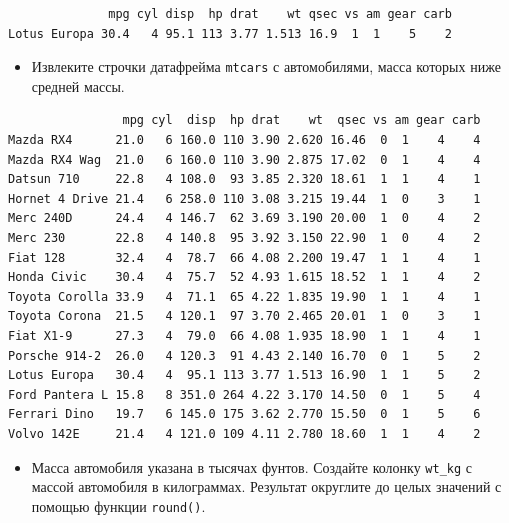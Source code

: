 \documentclass[
]{book}
\newenvironment{Shaded}{\begin{snugshade}}{\end{snugshade}}
\newcommand{\KeywordTok}[1]{\textcolor[rgb]{0.13,0.29,0.53}{\textbf{#1}}}
\newcommand{\NormalTok}[1]{#1}
\newcommand{\OperatorTok}[1]{\textcolor[rgb]{0.81,0.36,0.00}{\textbf{#1}}}
\newcommand{\StringTok}[1]{\textcolor[rgb]{0.31,0.60,0.02}{#1}}
\providecommand{\tightlist}{%
  \setlength{\itemsep}{0pt}\setlength{\parskip}{0pt}}
\begin{document}
\begin{verbatim}
              mpg cyl disp  hp drat    wt qsec vs am gear carb
Lotus Europa 30.4   4 95.1 113 3.77 1.513 16.9  1  1    5    2
\end{verbatim}

\begin{itemize}
\tightlist
\item
  Извлеките строчки датафрейма \texttt{mtcars} с автомобилями, масса которых ниже средней массы.
\end{itemize}

\begin{Shaded}
\end{Shaded}

\begin{verbatim}
                mpg cyl  disp  hp drat    wt  qsec vs am gear carb
Mazda RX4      21.0   6 160.0 110 3.90 2.620 16.46  0  1    4    4
Mazda RX4 Wag  21.0   6 160.0 110 3.90 2.875 17.02  0  1    4    4
Datsun 710     22.8   4 108.0  93 3.85 2.320 18.61  1  1    4    1
Hornet 4 Drive 21.4   6 258.0 110 3.08 3.215 19.44  1  0    3    1
Merc 240D      24.4   4 146.7  62 3.69 3.190 20.00  1  0    4    2
Merc 230       22.8   4 140.8  95 3.92 3.150 22.90  1  0    4    2
Fiat 128       32.4   4  78.7  66 4.08 2.200 19.47  1  1    4    1
Honda Civic    30.4   4  75.7  52 4.93 1.615 18.52  1  1    4    2
Toyota Corolla 33.9   4  71.1  65 4.22 1.835 19.90  1  1    4    1
Toyota Corona  21.5   4 120.1  97 3.70 2.465 20.01  1  0    3    1
Fiat X1-9      27.3   4  79.0  66 4.08 1.935 18.90  1  1    4    1
Porsche 914-2  26.0   4 120.3  91 4.43 2.140 16.70  0  1    5    2
Lotus Europa   30.4   4  95.1 113 3.77 1.513 16.90  1  1    5    2
Ford Pantera L 15.8   8 351.0 264 4.22 3.170 14.50  0  1    5    4
Ferrari Dino   19.7   6 145.0 175 3.62 2.770 15.50  0  1    5    6
Volvo 142E     21.4   4 121.0 109 4.11 2.780 18.60  1  1    4    2
\end{verbatim}

\begin{itemize}
\tightlist
\item
  Масса автомобиля указана в тысячах фунтов. Создайте колонку \texttt{wt\_kg} с массой автомобиля в килограммах. Результат округлите до целых значений с помощью функции \texttt{round()}.
\end{itemize}
\end{document}

